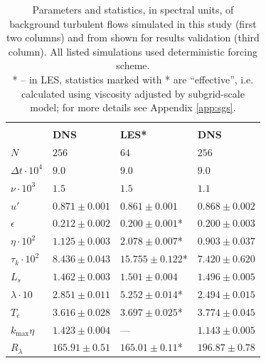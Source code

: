 \documentclass{pracamgren}
\begin{document}
\begin{table}[h]
\centering
\begin{tabular}{llll}
 & & & \scriptsize{\textcite{Rosa2013}}  \\
 & \textbf{DNS} & \textbf{LES*} & \textbf{DNS}  \\ \hline
$N$ & $256$ & $64$ & $256$ \\
$\Delta t \cdot 10^{4}$ & $9.0$ & $9.0$ & $9.0$  \\
$\nu \cdot 10^{3}$ & $1.5$ & $1.5$ & $1.1$  \\

$u'$ & $0.871 \pm 0.001 $ & $0.861 \pm 0.001 $ & $0.868 \pm 0.002 $ \\
$\epsilon$ & $0.212 \pm 0.002 $ & $0.200 \pm 0.001$* & $0.200 \pm 0.003 $  \\

$\eta \cdot 10^{2}$ & $1.125 \pm 0.003$ & $2.078 \pm 0.007$* & $0.903 \pm 0.037$  \\
$\tau_{k} \cdot 10^{2}$ & $8.436 \pm 0.043$ & $15.755 \pm 0.122$* & $7.420 \pm 0.620$  \\
$L_{s}$ & $1.462 \pm 0.003$ & $1.501 \pm 0.004$ & $1.496 \pm 0.005$  \\
$\lambda \cdot 10$ & $2.851 \pm 0.011$ & $5.252 \pm 0.014$* & $2.494 \pm 0.015$  \\
$T_{e}$ & $3.616 \pm 0.028$ & $3.697 \pm 0.025$* & $3.774 \pm 0.045$  \\

$k_{\max} \eta$ & $1.423 \pm 0.004 $ & --- & $1.143 \pm 0.005 $  \\
$R_{\lambda}$ & $165.91 \pm 0.51 $ & $165.01 \pm 0.11$* & $196.87 \pm 0.78 $            
\end{tabular}
\caption{Parameters and statistics, in spectral units, of background turbulent flows simulated in this study (first two columns) and from \textcite{Rosa2013} shown for results validation (third column). 
All listed simulations used deterministic forcing scheme. \\
* -- in LES, statistics marked with * are ``effective'', i.e. calculated using viscosity adjusted by subgrid-scale model; for more details see Appendix \ref{app:sgs}.}
\label{tab:flow-stats}
\end{table}
\end{document}

